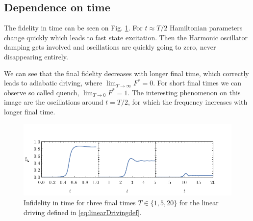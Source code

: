 \subsection{Dependence on time}
The fidelity in time can be seen on Fig. \ref{fig:infidelityTimePlotLin}. For $t\approx T/2$ Hamiltonian parameters change quickly which leads to fast state excitation. Then the Harmonic oscillator damping gets involved and oscillations are quickly going to zero, never disappearing entirely.

We can see that the final fidelity decreases with longer final time, which correctly leads to adiabatic driving, where $\lim_{T\rightarrow \infty} F^*=0$. For short final times we can observe so called quench, $\lim_{T\rightarrow 0} F^*=1$. The interesting phenomenon on this image are the oscillations around $t=T/2$, for which the frequency increases with longer final time. 

\begin{figure}[H]
    \centering 
    \includegraphics[scale=1.185]{../img/infidelityInTimePlot1.pdf}
    \caption{Infidelity in time for three final times $T\in\{1,5,20\}$ for the linear driving defined in \ref{eq:linearDrivingdef}.}
  \label{fig:infidelityTimePlotLin}
\end{figure}


